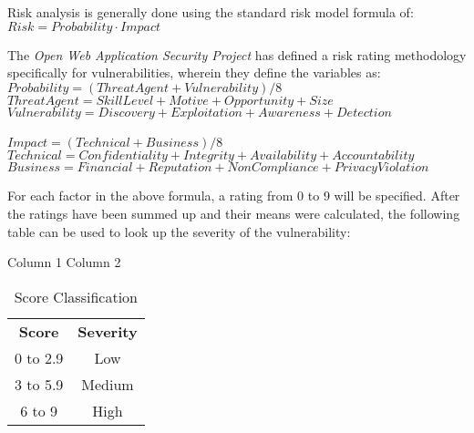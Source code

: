 \documentclass[a4paper,12pt]{article}
\begin{document}
	Risk analysis is generally done using the standard risk model formula of:
	\vspace{1.25em}\\
	$ Risk = Probability \cdot Impact $
	
	The \textit{Open Web Application Security Project} has defined a risk rating methodology\cite{owasp4} specifically for vulnerabilities, wherein they define the variables as:
	\vspace{1.25em}\\
	$ Probability = (Threat Agent + Vulnerability) / 8 $\\
	\indent $ Threat Agent = Skill Level + Motive + Opportunity + Size $\\
	\indent $ Vulnerability = Discovery + Exploitation + Awareness + Detection $\\
	\vspace{1.25em}\\
	$ Impact = (Technical + Business) / 8 $\\
	\indent $ Technical = Confidentiality + Integrity + Availability + Accountability $\\
	\indent $ Business = Financial + Reputation + NonCompliance + Privacy Violation $
	
	For each factor in the above formula, a rating from 0 to 9 will be specified. After the ratings have been summed up and their means were calculated, the following table can be used to look up the severity of the vulnerability:
	
	\begin{multicols}{2}
		Column 1
		\columnbreak
		Column 2
	\end{multicols}
	
	\begin{table}[!htbp]
		\centering
		\begin{tabular}{cc}
			{\bf Score} & {\bf Severity} \\
			0 to 2.9 & \cellcolor[HTML]{FCFF2F}Low \\
			3 to 5.9 & \cellcolor[HTML]{F8A102}Medium \\
			6 to 9 & \cellcolor[HTML]{FE0000}High
		\end{tabular}
		\caption{Score Classification}
		\label{scoreclass}
	\end{table}
	
\end{document}
